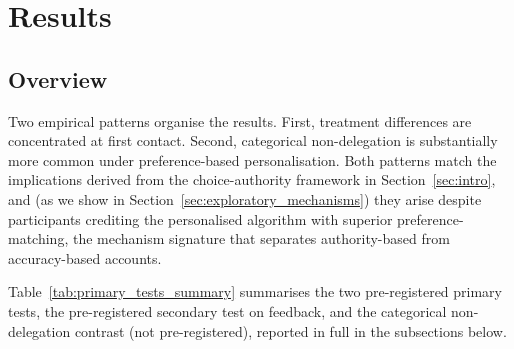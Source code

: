 \documentclass[a4paper, 12pt, fleqn]{article}
\theoremstyle{hypstyle}
\begin{document}
\section{Results}
\label{sec:results}

\subsection{Overview}
Two empirical patterns organise the results. First, treatment differences are concentrated at first contact. Second, categorical non-delegation is substantially more common under preference-based personalisation. Both patterns match the implications derived from the choice-authority framework in Section~\ref{sec:intro}, and (as we show in Section~\ref{sec:exploratory_mechanisms}) they arise despite participants crediting the personalised algorithm with superior preference-matching, the mechanism signature that separates authority-based from accuracy-based accounts.

Table~\ref{tab:primary_tests_summary} summarises the two pre-registered primary tests, the pre-registered secondary test on feedback, and the categorical non-delegation contrast (not pre-registered), reported in full in the subsections below.
\end{document}
